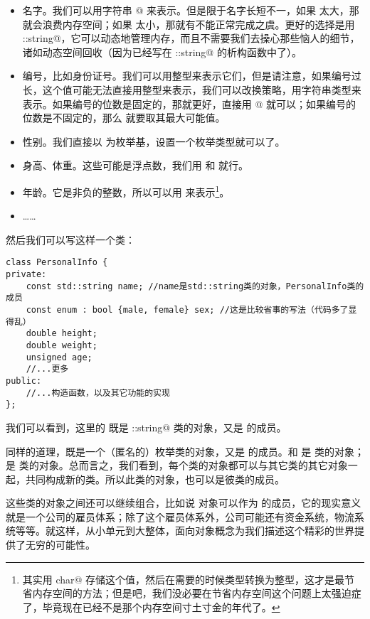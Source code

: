 \begin{itemize}
    \item 名字。我们可以用字符串 \lstinline@char[N]@ 来表示。但是限于名字长短不一，如果 \lstinline@N@ 太大，那就会浪费内存空间；如果 \lstinline@N@ 太小，那就有不能正常完成之虞。更好的选择是用 \lstinline@std::string@，它可以动态地管理内存，而且不需要我们去操心那些恼人的细节，诸如动态空间回收（因为已经写在 \lstinline@std::string@ 的析构函数中了）。
    \item 编号，比如身份证号。我们可以用整型来表示它们，但是请注意，如果编号过长，这个值可能无法直接用整型来表示，我们可以改换策略，用字符串类型来表示。如果编号的位数是固定的，那就更好，直接用 \lstinline@char[N]@ 就可以；如果编号的位数是不固定的，那么 \lstinline@N@ 就要取其最大可能值。
    \item 性别。我们直接以 \lstinline@bool@ 为枚举基，设置一个枚举类型就可以了。
    \item 身高、体重。这些可能是浮点数，我们用 \lstinline@float@ 和 \lstinline@double@ 就行。
    \item 年龄。它是非负的整数，所以可以用 \lstinline@unsigned@ 来表示\footnote{其实用 \lstinline@unsigned char@ 存储这个值，然后在需要的时候类型转换为整型，这才是最节省内存空间的方法；但是吧，我们没必要在节省内存空间这个问题上太强迫症了，毕竟现在已经不是那个内存空间寸土寸金的年代了。}。
    \item ……
\end{itemize}\par\pagebreak
然后我们可以写这样一个类：
\begin{lstlisting}
class PersonalInfo {
private:
    const std::string name; //name是std::string类的对象，PersonalInfo类的成员
    const enum : bool {male, female} sex; //这是比较省事的写法（代码多了显得乱）
    double height;
    double weight;
    unsigned age;
    //...更多
public:
    //...构造函数，以及其它功能的实现
};
\end{lstlisting}\par
我们可以看到，这里的 \lstinline@name@ 既是 \lstinline@std::string@ 类的对象，又是 \lstinline@PersonalInfo@ 的成员。\par
同样的道理，\lstinline@sex@ 既是一个（匿名的）枚举类的对象，又是 \lstinline@PersonalInfo@ 的成员。\lstinline@height@ 和 \lstinline@weight@ 是 \lstinline@double@ 类的对象；\lstinline@age@ 是 \lstinline@unsigned@ 类的对象。总而言之，我们看到，每个类的对象都可以与其它类的其它对象一起，共同构成新的类。所以此类的对象，也可以是彼类的成员。\par
这些类的对象之间还可以继续组合，比如说 \lstinline@PersonalInfo@ 对象可以作为 \lstinline@Company@ 的成员，它的现实意义就是一个公司的雇员体系；除了这个雇员体系外，公司可能还有资金系统，物流系统等等。就这样，从小单元到大整体，面向对象概念为我们描述这个精彩的世界提供了无穷的可能性。\par
